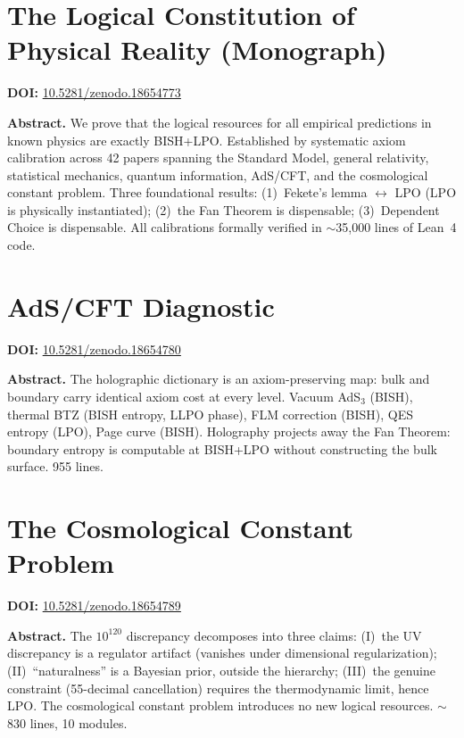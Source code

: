 \documentclass[11pt,a4paper]{article}
\begin{document}
\section{The Logical Constitution of Physical Reality (Monograph)}
\label{sec:p40}
\textbf{DOI:} \href{https://doi.org/10.5281/zenodo.18654773}{10.5281/zenodo.18654773}

\bigskip
\noindent\textbf{Abstract.}
We prove that the logical resources for all empirical predictions in known physics are exactly BISH+LPO. Established by systematic axiom calibration across 42 papers spanning the Standard Model, general relativity, statistical mechanics, quantum information, AdS/CFT, and the cosmological constant problem. Three foundational results: (1)~Fekete's lemma $\leftrightarrow$ LPO (LPO is physically instantiated); (2)~the Fan Theorem is dispensable; (3)~Dependent Choice is dispensable. All calibrations formally verified in $\sim$35,000 lines of Lean~4 code.

\section{AdS/CFT Diagnostic}
\label{sec:p41}
\textbf{DOI:} \href{https://doi.org/10.5281/zenodo.18654780}{10.5281/zenodo.18654780}

\bigskip
\noindent\textbf{Abstract.}
The holographic dictionary is an axiom-preserving map: bulk and boundary carry identical axiom cost at every level. Vacuum AdS$_3$ (BISH), thermal BTZ (BISH entropy, LLPO phase), FLM correction (BISH), QES entropy (LPO), Page curve (BISH). Holography projects away the Fan Theorem: boundary entropy is computable at BISH+LPO without constructing the bulk surface. 955 lines.

\section{The Cosmological Constant Problem}
\label{sec:p42}
\textbf{DOI:} \href{https://doi.org/10.5281/zenodo.18654789}{10.5281/zenodo.18654789}

\bigskip
\noindent\textbf{Abstract.}
The $10^{120}$ discrepancy decomposes into three claims: (I)~the UV discrepancy is a regulator artifact (vanishes under dimensional regularization); (II)~``naturalness'' is a Bayesian prior, outside the hierarchy; (III)~the genuine constraint (55-decimal cancellation) requires the thermodynamic limit, hence LPO. The cosmological constant problem introduces no new logical resources. $\sim$830 lines, 10 modules.
\end{document}
